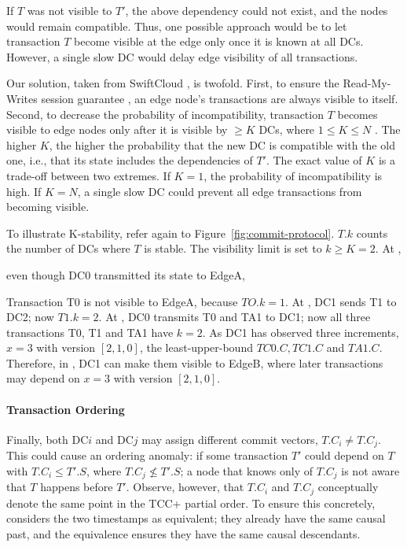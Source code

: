 If $T$ was not visible to $T'$, the above dependency could not exist,
and the nodes would remain compatible.
Thus, one possible approach would be to let transaction $T$ become
visible at the edge only once it is known at all DCs.
However, a single slow DC would delay edge visibility of all 
transactions.

Our solution, taken from SwiftCloud \cite{rep:pan:sh177}, is twofold.
First, to ensure the Read-My-Writes session guarantee
\cite{rep:syn:1481}, an edge node's transactions are always visible to
itself.
Second, to decrease the probability of incompatibility, transaction
$T$ becomes visible to edge nodes only after it is visible by $\ge
K$ DCs, where $1 \le K \le N$ \cite{rep:pan:sh177}.
The higher $K$, the higher the probability that the new DC is compatible
with the old one, i.e., that its state includes the dependencies of
$T'$.
The exact value of $K$ is a trade-off between two extremes.
If $K=1$, the probability of incompatibility is high.
If $K=N$, a single slow DC could prevent all edge transactions from becoming
visible.  

To illustrate K-stability, refer again to
Figure~\ref{fig:commit-protocol}.
$T.k$ counts the number of DCs where $T$ is stable.
The visibility limit is set to $k \ge K = 2$.
At ,

even though DC0 transmitted its state to EdgeA,

Transaction T0 is not visible to EdgeA, because $TO.k =
1$.
At , DC1 sends T1 to DC2; now $T1.k=2$.
At , DC0 transmits T0 and TA1 to DC1; now all three transactions T0,
T1 and TA1 have $k=2$.
As DC1 has observed three increments, $x=3$ with version $[2,1,0]$, the
least-upper-bound $TC0.C, TC1.C$ and $TA1.C$.
Therefore, in , DC1 can make them visible to EdgeB, where later
transactions may depend on $x=3$ with version $[2,1,0]$.

\paragraph{Transaction Ordering}

Finally, both DC$i$ and DC$j$ may assign different commit vectors,
$T.C_{i} \neq T.C_{j}$.
This could cause an ordering anomaly: if some transaction $T'$ could
depend on $T$ with $T.C_{i} \le T'.S$, where $T.C_{j} \nleq T'.S$; a
node that knows only of $T.C_{j}$ is not aware that $T$ happens before
$T'$.
Observe, however, that $T.C_{i}$ and $ T.C_{j}$ conceptually denote the
same point in the TCC+ partial order.
To ensure this concretely, \system{} considers the two timestamps as
equivalent; they already have the same causal past, and the equivalence
ensures they have the same causal descendants.

